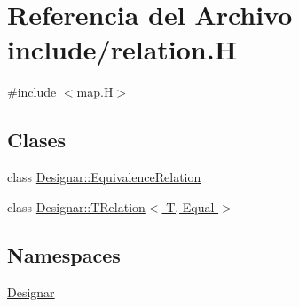 \hypertarget{relation_8_h}{}\section{Referencia del Archivo include/relation.H}
\label{relation_8_h}
{\ttfamily \#include $<$map.\+H$>$}\newline
\subsection*{Clases}
\begin{DoxyCompactItemize}
\item 
class \hyperlink{class_designar_1_1_equivalence_relation}{Designar\+::\+Equivalence\+Relation}
\item 
class \hyperlink{class_designar_1_1_t_relation}{Designar\+::\+T\+Relation$<$ T, Equal $>$}
\end{DoxyCompactItemize}
\subsection*{Namespaces}
\begin{DoxyCompactItemize}
\item 
 \hyperlink{namespace_designar}{Designar}
\end{DoxyCompactItemize}
